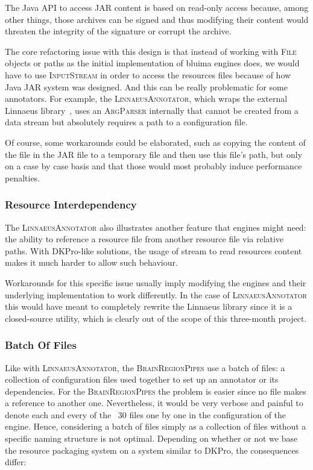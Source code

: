 \documentclass{article}
\newcommand{\ID}[1]{{\textsc{#1}}}
\newcommand{\JAR}{JAR\xspace}
\begin{document}
The Java API to access \JAR content is based on read-only access because, among other things, those
archives can be signed and thus modifying their content would threaten the integrity of the
signature or corrupt the archive.

The core refactoring issue with this design is that instead of working with \ID{File} objects or
paths as the initial implementation of bluima engines does, we would have to use \ID{InputStream} in
order to access the resources files because of how Java \JAR system was designed. And this can be
really problematic for some annotators. For example, the \ID{LinnaeusAnnotator}, which wraps the
external Linnaeus library~\cite{linnaeus}, uses an \ID{ArgParser} internally that cannot be created
from a data stream but absolutely requires a path to a configuration file.

Of course, some workarounds could be elaborated, such as copying the content of the file in the \JAR
file to a temporary file and then use this file's path, but only on a case by case basis and that
those would most probably induce performance penalties.

\subsubsection{Resource Interdependency}

The \ID{LinnaeusAnnotator} also illustrates another feature that engines might need: the ability to
reference a resource file from another resource file via relative paths. With DKPro-like solutions,
the usage of stream to read resources content makes it much harder to allow such behaviour.

Workarounds for this specific issue usually imply modifying the engines and their underlying
implementation to work differently. In the case of \ID{Linnaeus\-Annotator} this would have meant to
completely rewrite the Linnaeus library since it is a closed-source utility, which is clearly out of
the scope of this three-month project.

\subsubsection{Batch Of Files}

Like with \ID{LinnaeusAnnotator}, the \ID{BrainRegionPipes} use a batch of files: a collection of
configuration files used together to set up an annotator or its dependencies. For the
\ID{BrainRegionPipes} the problem is easier since no file makes a reference to another one.
Nevertheless, it would be very verbose and painful to denote each and every of the ~30 files one by
one in the configuration of the engine. Hence, considering a batch of files simply as a collection
of files without a specific naming structure is not optimal. Depending on whether or not we base the
resource packaging system on a system similar to DKPro, the consequences differ:
\end{document}
